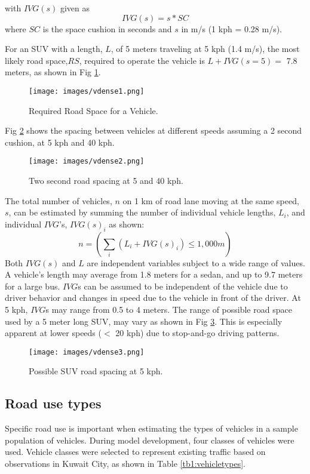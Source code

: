 \noindent
with $IVG(s)$ given as
%
\begin{equation}
\label{eq:ivg}
IVG(s) = s * SC
\end{equation}
%
\noindent
where $SC$ is the space cushion in seconds and $s$ in m/s (1 kph = 0.28 m/s). 

For an SUV with a length, $L$, of 5 meters traveling at 5 kph (1.4 m/s), the most likely road space,$RS$, required to operate the vehicle is $L + IVG(s=5) =$ 7.8 meters, as shown in Fig \ref{fig1:roadspace}.  
\begin{figure}
\texttt{[image: images/vdense1.png]} 
\caption{Required Road Space for a Vehicle.}
\label{fig1:roadspace}
\end{figure}
%
Fig \ref{fig2:2secroadspace} shows the spacing between vehicles at different speeds assuming a 2 second cushion, at 5 kph and 40 kph.
%
%
\begin{figure}
\texttt{[image: images/vdense2.png]} 
\caption{Two second road spacing at 5 and 40 kph.}
\label{fig2:2secroadspace}
\end{figure}
%

The total number of vehicles, $n$ on 1 km of road lane moving at the same speed, $s$, can be estimated by summing the number of individual vehicle lengths, $L_{i}$, and individual $IVG$'s, $IVG(s)_{i}$ as shown:
% 
\begin{equation}
\label{eq1:roadspace}
n =  \left ( \sum_{i}\left ({L_{i} + IVG(s)_{i}} \right )\leq 1,000m   \right ) 
\end{equation}
%
Both $IVG(s)$ and $L$ are independent variables subject to a wide range of values.  A vehicle’s length may average from 1.8 meters for a sedan, and up to 9.7 meters for a large bus.  $IVG$s can be assumed to be independent of the vehicle due to driver behavior and changes in speed due to the vehicle in front of the driver.  At 5 kph, $IVG$s may range from 0.5 to 4 meters.  The range of possible road space used by a 5 meter long SUV, may vary as shown in Fig \ref{fig3:SUVspace}.  This is especially apparent at lower speeds ($<$ 20 kph) due to stop-and-go driving patterns.  

%
\begin{figure}
\texttt{[image: images/vdense3.png]} 
\caption{Possible SUV road spacing at 5 kph.}
\label{fig3:SUVspace}
\end{figure}
%
\subsection{Road use types}
Specific road use is important when estimating the types of vehicles in a sample population of vehicles.  During model development, four classes of vehicles were used.  Vehicle classes were selected to represent existing traffic based on observations in Kuwait City, as shown in Table \ref{tb1:vehicletypes}.

